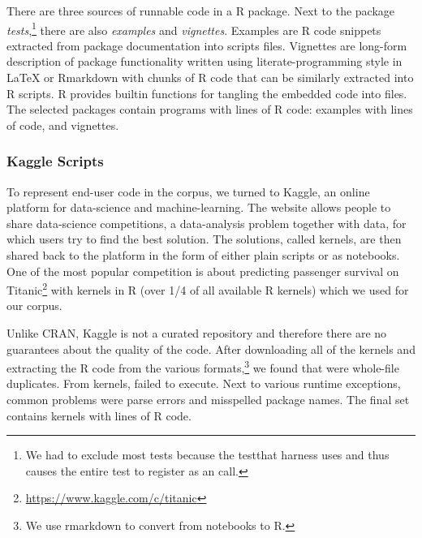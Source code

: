 \documentclass[USenglish,cleveref, autoref, thm-restate]{lipics-v2019}
\begin{document}
There are three sources of runnable code in a R package. Next to the package
\emph{tests},\footnote{We had to exclude most tests because the {testthat}
  harness uses \eval and thus causes the entire test to register as an \eval
  call.} there are also \emph{examples} and \emph{vignettes}. Examples are R
code snippets extracted from package documentation into scripts files.
Vignettes are long-form description of package functionality written using
literate-programming style in \LaTeX\xspace or Rmarkdown with chunks of R
code that can be similarly extracted into R scripts. R provides builtin
functions for tangling the embedded code into files.  The selected packages
contain \CorpusPackagePrograms programs with \CorpusPackageProgramsCodeRnd
lines of R code: \CorpusExamplesProgramsRnd examples with
\CorpusExamplesCodeRnd lines of code, and \CorpusVignettesProgramsRnd
vignettes.

\subsubsection{Kaggle Scripts}

To represent end-user code in the corpus, we turned to Kaggle, an online
platform for data-science and machine-learning. The website allows people to
share data-science competitions, a data-analysis problem together with data,
for which users try to find the best solution. The solutions, called
{kernels}, are then shared back to the platform in the form of either plain
scripts or as notebooks.  One of the most popular competition is about
predicting passenger survival on
Titanic\footnote{\url{https://www.kaggle.com/c/titanic}} with \CorpusKaggle
kernels in R (over 1/4 of all available R kernels) which we used for our
corpus.

Unlike CRAN, Kaggle is not a curated repository and therefore there are no
guarantees about the quality of the code. After downloading all of the
\CorpusKaggle kernels and extracting the R code from the various
formats,\footnote{We use {\sf rmarkdown} to convert from notebooks to R.} we
found that \CorpusDuplicatedKaggle were whole-file duplicates. From
\CorpusRunnableKaggle kernels, \CorpusFailedKaggle failed to execute. Next
to various runtime exceptions, common problems were parse errors and
misspelled package names.  The final set contains \CorpusFinishedKaggle
kernels with \CorpusFinishedKaggleCodeRnd lines of R code.
\end{document}
